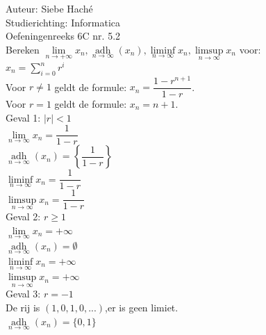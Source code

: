 \documentclass[a4paper]{article}
\begin{document}
\noindent \large Auteur: Siebe Haché \\
\noindent \large Studierichting: Informatica \\
\noindent \large Oefeningenreeks 6C nr. 5.2 \\

\medskip
\normalsize
Bereken $\lim\limits_{n \rightarrow +\infty}x_n, \operatorname*{adh}\limits_{n \rightarrow \infty}\left(x_n\right), \liminf\limits_{n \rightarrow \infty}x_n, \limsup\limits_{n \rightarrow \infty}x_n$ voor:\\

$x_n=\displaystyle\sum_{i=0}^{n}r^i$ \\

Voor $r \neq 1$ geldt de formule: $x_n = \dfrac{1 - r^{n+1}}{1 - r}$. \\

Voor $r = 1$ geldt de formule: $x_n = n + 1$. \\

Geval 1: $|r| < 1$ \\

$\lim\limits_{n \to \infty} x_n = \dfrac{1}{1 - r}$ \\

$\operatorname*{adh}\limits_{n \to \infty} (x_n) = \left\{ \dfrac{1}{1 - r} \right\}$ \\

$\liminf\limits_{n \to \infty} x_n = \dfrac{1}{1 - r}$ \\

$\limsup\limits_{n \to \infty} x_n = \dfrac{1}{1 - r}$ \\

Geval 2: $r \geq 1$ \\

$\lim\limits_{n \to \infty} x_n = +\infty$ \\

$\operatorname*{adh}\limits_{n \to \infty} (x_n) = \emptyset$ \\

$\liminf\limits_{n \to \infty} x_n = +\infty$ \\

$\limsup\limits_{n \to \infty} x_n = +\infty$ \\

Geval 3: $r = -1$ \\

De rij is $(1, 0, 1, 0,...)$,er is geen limiet. \\

$\operatorname*{adh}\limits_{n \to \infty} (x_n) = \{0, 1\}$ \\
\end{document}
